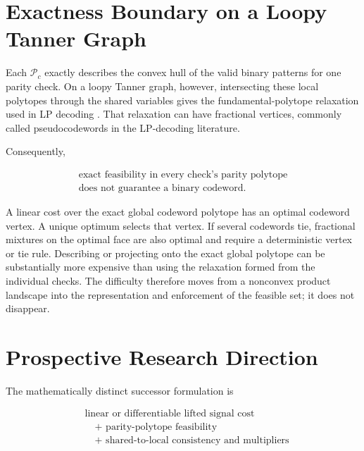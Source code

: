 \documentclass[11pt]{article}
\theoremstyle{remark}
\newcommand{\Pc}{\mathcal{P}_c}
\begin{document}
\section{Exactness Boundary on a Loopy Tanner Graph}

Each $\Pc$ exactly describes the convex hull of the valid binary patterns for
one parity check.  On a loopy Tanner graph, however, intersecting these local
polytopes through the shared variables gives the fundamental-polytope
relaxation used in LP decoding \cite{feldman2005lp}.  That relaxation can have
fractional vertices, commonly called pseudocodewords in the LP-decoding
literature.

Consequently,

\begin{equation}
\begin{gathered}
\text{exact feasibility in every check's parity polytope}\\
\text{does not guarantee a binary codeword}.
\end{gathered}
\end{equation}

A linear cost over the exact global codeword polytope has an optimal codeword
vertex.  A unique optimum selects that vertex.  If several codewords tie,
fractional mixtures on the optimal face are also optimal and require a
deterministic vertex or tie rule.  Describing or projecting onto the exact
global polytope can be substantially more expensive than using the relaxation
formed from the individual checks.  The difficulty therefore moves from a
nonconvex product landscape
into the representation and enforcement of the feasible set; it does not
disappear.

\section{Prospective Research Direction}

The mathematically distinct successor formulation is

\begin{equation}
\boxed{
\begin{aligned}
&\text{linear or differentiable lifted signal cost}\\
&\quad+\text{ parity-polytope feasibility}\\
&\quad+\text{ shared-to-local consistency and multipliers}
\end{aligned}}
\end{equation}
\end{document}
